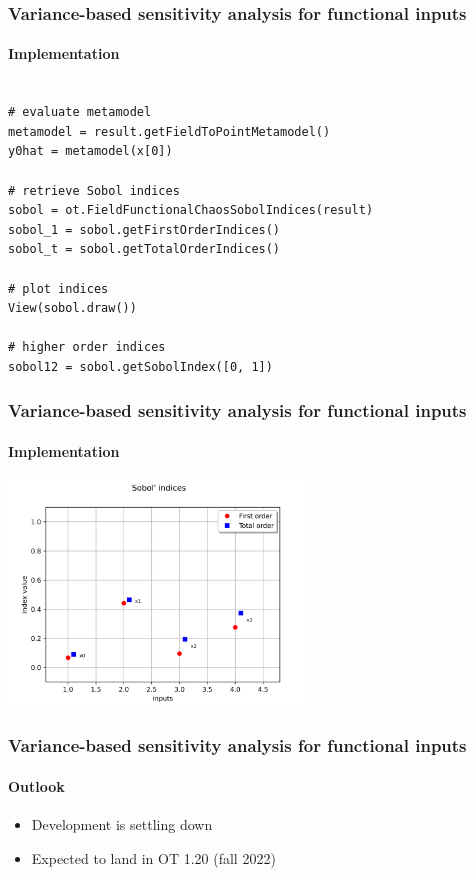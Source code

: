 \documentclass[aspectratio=169]{beamer}
\begin{document}
\begin{frame}[containsverbatim]
\frametitle{Variance-based sensitivity analysis for functional inputs}

\framesubtitle{Implementation}

\lstset{language=python}
\begin{lstlisting}

# evaluate metamodel
metamodel = result.getFieldToPointMetamodel()
y0hat = metamodel(x[0])

# retrieve Sobol indices
sobol = ot.FieldFunctionalChaosSobolIndices(result)
sobol_1 = sobol.getFirstOrderIndices()
sobol_t = sobol.getTotalOrderIndices()

# plot indices
View(sobol.draw())

# higher order indices
sobol12 = sobol.getSobolIndex([0, 1])

\end{lstlisting}

\end{frame}

\begin{frame}[containsverbatim]
\frametitle{Variance-based sensitivity analysis for functional inputs}

\framesubtitle{Implementation}

\begin{center}
\includegraphics[width=0.6\textwidth]{figures/sobol.png}
\end{center}

\end{frame}


\begin{frame}[containsverbatim]
\frametitle{Variance-based sensitivity analysis for functional inputs}

\framesubtitle{Outlook}

\begin{itemize}
\item Development is settling down
\item Expected to land in OT 1.20 (fall 2022)
\end{itemize}

\end{frame}
\end{document}
